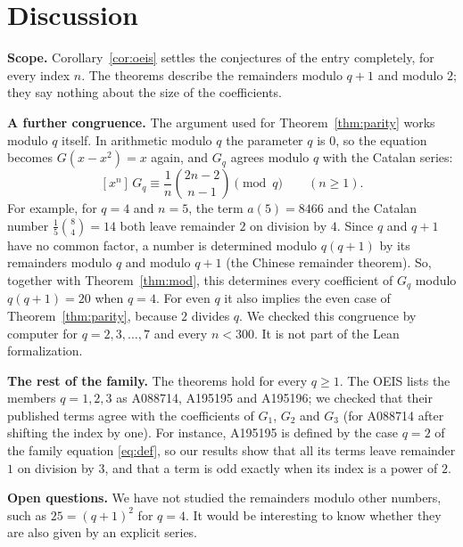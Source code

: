 \documentclass[11pt,a4paper]{article}
\theoremstyle{definition}
\theoremstyle{remark}
\newcommand{\coeff}[2]{[x^{#1}]\,#2}
\newcommand{\para}[1]{\par\medskip\noindent\textbf{#1}\enspace}
\begin{document}
\section{Discussion}\label{sec:discussion}

\para{Scope.} Corollary~\ref{cor:oeis} settles the conjectures of the entry completely,
for every index $n$. The theorems describe the remainders modulo $q+1$ and modulo $2$; they say nothing about the size
of the coefficients.

\para{A further congruence.} The argument used for Theorem~\ref{thm:parity} works modulo $q$ itself. In arithmetic
modulo $q$ the parameter $q$ is $0$, so the equation becomes $G(x-x^2)=x$ again, and $G_q$ agrees modulo $q$ with the
Catalan series:
\[
\coeff{n}{G_q}\equiv\frac{1}{n}\binom{2n-2}{n-1}\pmod q\qquad(n\ge1).
\]
For example, for $q=4$ and $n=5$, the term $a(5)=8466$ and the Catalan number $\frac15\binom84=14$ both leave remainder $2$ on division by $4$. Since $q$ and $q+1$ have no common factor, a number is determined modulo $q(q+1)$ by its
remainders modulo $q$ and modulo $q+1$ (the Chinese remainder theorem). So, together with Theorem~\ref{thm:mod}, this
determines every coefficient of $G_q$ modulo $q(q+1)=20$ when $q=4$. For even $q$ it also implies the even case of Theorem~\ref{thm:parity}, because $2$ divides $q$. We checked
this congruence by computer for $q=2,3,\dots,7$ and every $n<300$. It is not part of the Lean formalization.

\para{The rest of the family.} The theorems hold for every $q\ge1$. The OEIS lists the members $q=1,2,3$ as A088714,
A195195 and A195196; we checked that their published terms agree with the coefficients of $G_1$, $G_2$ and $G_3$ (for
A088714 after shifting the index by one). For instance, A195195 is defined by the case $q=2$ of
the family equation \eqref{eq:def}, so our results show that all its terms leave remainder $1$ on division by $3$, and that a term is odd
exactly when its index is a power of $2$.

\para{Open questions.} We have not studied the remainders modulo other numbers, such as $25=(q+1)^2$
for $q=4$. It would be interesting to know whether they are also given by an explicit series.
\end{document}
